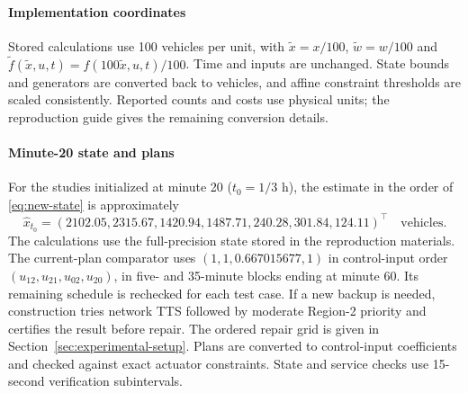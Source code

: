 \documentclass[final]{cas-sc}
\theoremstyle{definition}
\theoremstyle{plain}
\theoremstyle{definition}
\theoremstyle{plain}
\begin{document}
\paragraph{Implementation coordinates}
Stored calculations use 100 vehicles per unit, with
$\widetilde x=x/100$, $\widetilde w=w/100$ and
$\widetilde f(\widetilde x,u,t)=f(100\widetilde x,u,t)/100$.
Time and inputs are unchanged. State bounds and generators are
converted back to vehicles, and affine constraint thresholds are
scaled consistently. Reported counts and costs use physical units;
the reproduction guide gives the remaining conversion details.

\paragraph{Minute-20 state and plans}
For the studies initialized at minute 20 ($t_0=1/3$ h), the estimate
in the order of \eqref{eq:new-state} is approximately
\[
\widehat x_{t_0}=(2102.05,2315.67,1420.94,1487.71,240.28,301.84,124.11)^\top
\quad\text{vehicles}.
\]
The calculations use the full-precision state stored in the reproduction
materials. The current-plan comparator uses $(1,1,0.667015677,1)$ in control-input order
$(u_{12},\allowbreak u_{21},\allowbreak u_{02},\allowbreak u_{20})$, in five- and
35-minute blocks ending at minute 60. Its remaining schedule is rechecked for
each test case. If a new backup is needed, construction tries network TTS
followed by moderate Region-2 priority and certifies the result before
repair. The ordered repair grid is given in Section~\ref{sec:experimental-setup}.
Plans are converted to control-input coefficients and checked against exact
actuator constraints. State and service checks use 15-second verification subintervals.
\end{document}

